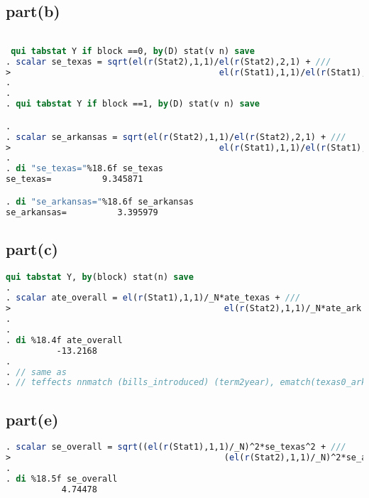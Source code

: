 \documentclass[a4paper]{article}
\begin{document}
\subsection*{part(b)}
\begin{lstlisting}[language=stata]

 qui tabstat Y if block ==0, by(D) stat(v n) save        
. scalar se_texas = sqrt(el(r(Stat2),1,1)/el(r(Stat2),2,1) + /// 
>                                         el(r(Stat1),1,1)/el(r(Stat1),2,1))
.                                         
. 
. qui tabstat Y if block ==1, by(D) stat(v n) save        

. 
. scalar se_arkansas = sqrt(el(r(Stat2),1,1)/el(r(Stat2),2,1) + /// 
>                                         el(r(Stat1),1,1)/el(r(Stat1),2,1)) 
. 
. di "se_texas="%18.6f se_texas
se_texas=          9.345871

. di "se_arkansas="%18.6f se_arkansas
se_arkansas=          3.395979

\end{lstlisting}

\subsection*{part(c)}
\begin{lstlisting}[language=stata]
 qui tabstat Y, by(block) stat(n) save   
. 
. scalar ate_overall = el(r(Stat1),1,1)/_N*ate_texas + /// 
>                                          el(r(Stat2),1,1)/_N*ate_ark
. 
. 
. di %18.4f ate_overall
          -13.2168
. 
. // same as
. // teffects nnmatch (bills_introduced) (term2year), ematch(texas0_arkansas1)

\end{lstlisting}


\subsection*{part(e)}
\begin{lstlisting}[language=stata]
. scalar se_overall = sqrt((el(r(Stat1),1,1)/_N)^2*se_texas^2 + /// 
>                                          (el(r(Stat2),1,1)/_N)^2*se_arkansas^2)
.                                          
. di %18.5f se_overall
           4.74478

\end{lstlisting}
\end{document}
